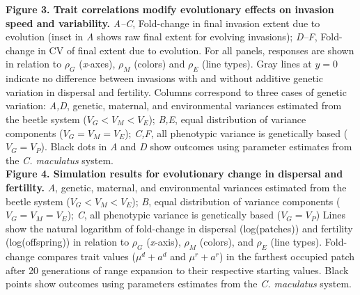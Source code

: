 \documentclass[11pt]{article}
\begin{document}
\noindent{} \textbf{Figure 3. Trait correlations modify evolutionary effects on invasion speed and variability.}
\textit{A--C}, Fold-change in final invasion extent due to evolution (inset in \textit{A} shows raw final extent for evolving invasions); \textit{D--F}, Fold-change in CV of final extent due to evolution.
For all panels, responses are shown in relation to $\rho_{G}$ (\textit{x}-axes), $\rho_{M}$ (colors) and $\rho_{E}$ (line types).
Gray lines at $y=0$ indicate no difference between invasions with and without additive genetic variation in dispersal and fertility. 
Columns correspond to three cases of genetic variation: \textit{A,D}, genetic, maternal, and environmental variances estimated from the beetle system ($V_{G} < V_{M} < V_{E}$); \textit{B,E}, equal distribution of variance components ($V_{G} = V_{M} = V_{E}$); \textit{C,F}, all phenotypic variance is genetically based ($V_{G} = V_{P}$). 
Black dots in \textit{A} and \textit{D} show outcomes using parameter estimates from the \textit{C. maculatus} system.\\

\noindent{} \textbf{Figure 4. Simulation results for evolutionary change in dispersal and fertility.} 
\textit{A}, genetic, maternal, and environmental variances estimated from the beetle system ($V_{G} < V_{M} < V_{E}$); \textit{B}, equal distribution of variance components ($V_{G} = V_{M} = V_{E}$); \textit{C}, all phenotypic variance is genetically based ($V_{G} = V_{P}$)
Lines show the natural logarithm of fold-change in dispersal (log(patches)) and fertility (log(offspring)) in relation to $\rho_{G}$ (\textit{x}-axis), $\rho_{M}$ (colors), and $\rho_{E}$ (line types).
Fold-change compares trait values ($\mu^{d} + a^{d}$ and $\mu^{r} + a^{r}$) in the farthest occupied patch after 20 generations of range expansion to their respective starting values.
Black points show outcomes using parameters estimates from the \textit{C. maculatus} system.\\

\newpage{}


\end{document}
